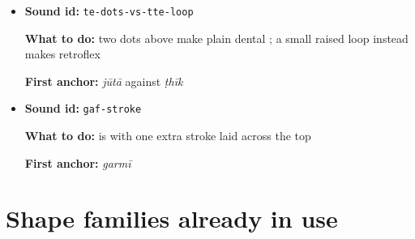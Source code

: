 \begin{itemize}
\begin{minipage}[t]{\linewidth}
  \par \textbf{What to do:} draw the back of the tongue further back in the throat for \textbf{} than for \textbf{}; many speakers merge the two in casual speech
  \par \textbf{First anchor:} \textbf{} \emph{qamīz}
  \end{minipage}
  \item \begin{minipage}[t]{\linewidth}
  \textbf{Sound id:} \texttt{te-dots-vs-tte-loop}
  \par \textbf{What to do:} two dots above make plain dental \textbf{}; a small raised loop instead makes retroflex \textbf{}
  \par \textbf{First anchor:} \textbf{} \emph{jūtā} against \textbf{} \emph{ṭhīk}
  \end{minipage}
  \item \begin{minipage}[t]{\linewidth}
  \textbf{Sound id:} \texttt{gaf-stroke}
  \par \textbf{What to do:} \textbf{} is \textbf{} with one extra stroke laid across the top
  \par \textbf{First anchor:} \textbf{} \emph{garmī}
  \end{minipage}
\end{itemize}

\section*{Shape families already in use}

